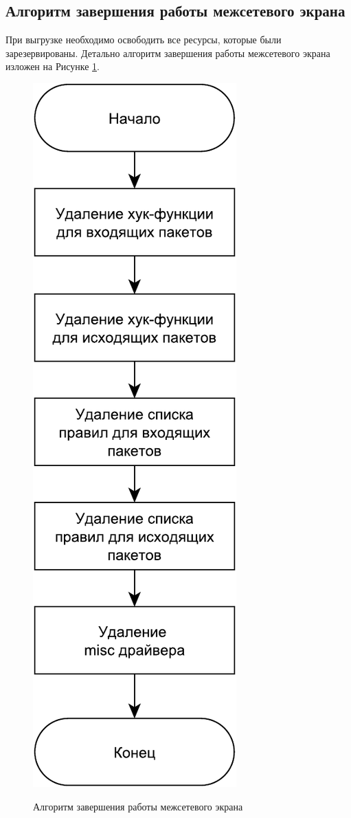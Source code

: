 \newpage

\subsection{Алгоритм завершения работы межсетевого экрана}
При выгрузке необходимо освободить все ресурсы, которые были зарезервированы. Детально алгоритм завершения работы межсетевого экрана изложен на Рисунке \ref{fig22:image}.
\begin{figure}[h!]
	\begin{center}
		{\includegraphics[scale = 0.6]{img/exit.pdf}}
		\caption{Алгоритм завершения работы межсетевого экрана}
		\label{fig22:image}
	\end{center}
\end{figure}

